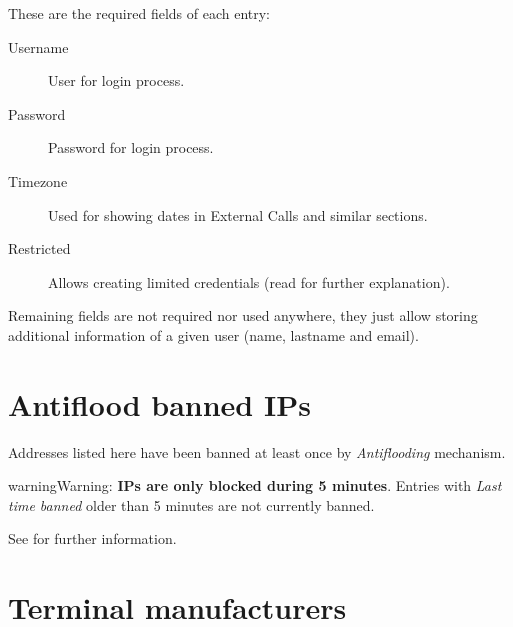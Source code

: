 \documentclass[letterpaper,10pt,english]{sphinxmanual}
\begin{document}
These are the required fields of each entry:
\begin{description}
\item[{Username}] \leavevmode{}\label{administration_portal/platform/main_operators:term-username}
User for login process.

\item[{Password}] \leavevmode{}\label{administration_portal/platform/main_operators:term-password}
Password for login process.

\item[{Timezone}] \leavevmode{}\label{administration_portal/platform/main_operators:term-timezone}
Used for showing dates in External Calls and similar sections.

\item[{Restricted}] \leavevmode{}\label{administration_portal/platform/main_operators:term-restricted}
Allows creating limited credentials (read {\hyperref[api_rest/acls:acls]{}} for further explanation).

\end{description}

Remaining fields are not required nor used anywhere, they just allow storing additional information of a given user
(name, lastname and email).


\section{Antiflood banned IPs}
\label{administration_portal/platform/antiflood_banned_ips:antiflood-banned-ips}\label{administration_portal/platform/antiflood_banned_ips::doc}
Addresses listed here have been banned at least once by \emph{Antiflooding} mechanism.

\begin{notice}{warning}{Warning:}
\textbf{IPs are only blocked during 5 minutes}. Entries with \emph{Last time banned} older than 5 minutes are not
currently banned.
\end{notice}

See {\hyperref[security_and_maintenance/security/antiflooding:sip\string-antiflooding]{}} for further information.


\section{Terminal manufacturers}
\label{administration_portal/platform/terminal_manufacturers:terminal-manufacturers}\label{administration_portal/platform/terminal_manufacturers::doc}\label{administration_portal/platform/terminal_manufacturers:provisioning}
\end{document}
